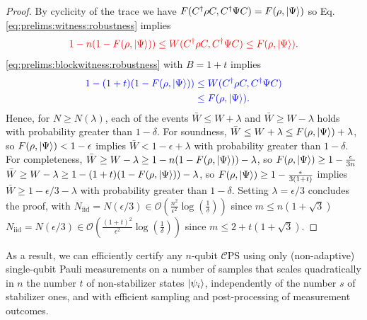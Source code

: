 \documentclass[a4paper,twocolumn,11pt,unpublished]{../../revision/quantumarticle}
\newcommand{\Niid}{N_{\mathrm{iid}}}
\newcommand{\mCEPS}{\mathcal{C}\text{PS}}
\providecommand{\DIFadd}[1]{{\protect\color{blue} \sf #1}} %
\providecommand{\DIFdel}[1]{{\protect\color{red} \scriptsize #1}} %
\providecommand{\DIFaddbegin}{} %
\providecommand{\DIFaddend}{} %
\providecommand{\DIFdelbegin}{} %
\providecommand{\DIFdelend}{} %
\begin{document}
\begin{proof}
        By cyclicity of the trace we have $F(C^\dagger\rho C,C^\dagger\Psi C)=F(\rho,\ket\Psi)$ so Eq.~\DIFdelbegin \DIFdel{\eqref{eq:prelims:witness:robustness} implies
        }\begin{displaymath}
            \DIFdel{1-n(1-F(\rho,\ket\Psi)) \leq W(C^\dagger\rho C,C^\dagger\Psi C) \leq F(\rho,\ket\Psi).
        }\end{displaymath}%
\DIFdelend \DIFaddbegin \DIFadd{\eqref{eq:prelims:blockwitness:robustness} with $B=1+t$ implies
        }\begin{equation}
            \DIFadd{\begin{aligned}
            1-(1+t)(1-F(\rho,\ket\Psi)) &\leq W(C^\dagger\rho C,C^\dagger\Psi C)\\
            &\leq F(\rho,\ket\Psi).
            \end{aligned}
        }\end{equation}\DIFaddend 
        Hence, for $N\ge N(\lambda)$, each of the events $\bar W \leq W + \lambda$ and $\bar W \geq W - \lambda$ holds with probability greater than $1-\delta$. For soundness, $\bar W \leq W+\lambda \leq F(\rho,\ket\Psi)+\lambda$, so $F(\rho,\ket\Psi)<1-\epsilon$ implies $\bar W<1-\epsilon+\lambda$ with probability greater than $1-\delta$. For completeness, \DIFdelbegin \DIFdel{$\bar W \geq W-\lambda \geq 1-n(1-F(\rho,\ket\Psi))-\lambda$, so $F(\rho,\ket\Psi)\ge1-\frac{\epsilon}{3n}$ }\DIFdelend \DIFaddbegin \DIFadd{$\bar W \geq W-\lambda \geq 1-(1+t)(1-F(\rho,\ket\Psi))-\lambda$, so $F(\rho,\ket\Psi)\ge1-\frac{\epsilon}{3(1+t)}$ }\DIFaddend implies $\bar W\ge1-\epsilon/3-\lambda$ with probability greater than $1-\delta$. Setting $\lambda=\epsilon/3$ concludes the proof, with \DIFdelbegin \DIFdel{$\Niid=N(\epsilon/3)\in\mathcal O(\frac{n^2}{\epsilon^2}\log(\frac{1}{\delta}))$ since $m\le n(1+\sqrt3)$}\DIFdelend \DIFaddbegin \DIFadd{$\Niid=N(\epsilon/3)\in\mathcal O(\frac{(1+t)^2}{\epsilon^2}\log(\frac{1}{\delta}))$ since $m\le 2+t(1+\sqrt3)$}\DIFaddend .
        \end{proof}
        As a result, we can efficiently certify any $n$-qubit $\mCEPS$ using only (non-adaptive) single-qubit Pauli measurements on a number of samples that scales quadratically in \DIFdelbegin \DIFdel{$n$ }\DIFdelend \DIFaddbegin \DIFadd{the number $t$ of non-stabilizer states $\ket{\psi_i}$, independently of the number $s$ of stabilizer ones, }\DIFaddend and with efficient sampling and post-processing of measurement outcomes.
\end{document}

